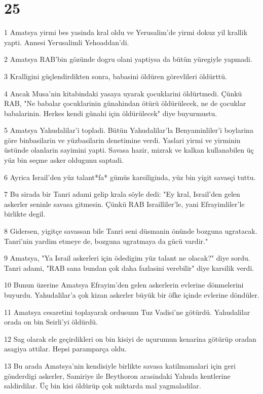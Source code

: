 \chapter{25}

\par 1 Amatsya yirmi bes yasinda kral oldu ve Yerusalim'de yirmi dokuz yil krallik yapti. Annesi Yerusalimli Yehoaddan'di.
\par 2 Amatsya RAB'bin gözünde dogru olani yaptiysa da bütün yüregiyle yapmadi.
\par 3 Kralligini güçlendirdikten sonra, babasini öldüren görevlileri öldürttü.
\par 4 Ancak Musa'nin kitabindaki yasaya uyarak çocuklarini öldürtmedi. Çünkü RAB, "Ne babalar çocuklarinin günahindan ötürü öldürülecek, ne de çocuklar babalarinin. Herkes kendi günahi için öldürülecek" diye buyurmustu.
\par 5 Amatsya Yahudalilar'i topladi. Bütün Yahudalilar'la Benyaminliler'i boylarina göre binbasilarin ve yüzbasilarin denetimine verdi. Yaslari yirmi ve yirminin üstünde olanlarin sayimini yapti. Savasa hazir, mizrak ve kalkan kullanabilen üç yüz bin seçme asker oldugunu saptadi.
\par 6 Ayrica Israil'den yüz talant*fa* gümüs karsiliginda, yüz bin yigit savasçi tuttu.
\par 7 Bu sirada bir Tanri adami gelip krala söyle dedi: "Ey kral, Israil'den gelen askerler seninle savasa gitmesin. Çünkü RAB Israilliler'le, yani Efrayimliler'le birlikte degil.
\par 8 Gidersen, yigitçe savassan bile Tanri seni düsmanin önünde bozguna ugratacak. Tanri'nin yardim etmeye de, bozguna ugratmaya da gücü vardir."
\par 9 Amatsya, "Ya Israil askerleri için ödedigim yüz talant ne olacak?" diye sordu. Tanri adami, "RAB sana bundan çok daha fazlasini verebilir" diye karsilik verdi.
\par 10 Bunun üzerine Amatsya Efrayim'den gelen askerlerin evlerine dönmelerini buyurdu. Yahudalilar'a çok kizan askerler büyük bir öfke içinde evlerine döndüler.
\par 11 Amatsya cesaretini toplayarak ordusunu Tuz Vadisi'ne götürdü. Yahudalilar orada on bin Seirli'yi öldürdü.
\par 12 Sag olarak ele geçirdikleri on bin kisiyi de uçurumun kenarina götürüp oradan asagiya attilar. Hepsi paramparça oldu.
\par 13 Bu arada Amatsya'nin kendisiyle birlikte savasa katilmamalari için geri gönderdigi askerler, Samiriye ile Beythoron arasindaki Yahuda kentlerine saldirdilar. Üç bin kisi öldürüp çok miktarda mal yagmaladilar.
